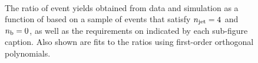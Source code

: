 \begin{figure}[h!]
\begin{center}
    \\
    \caption{The ratio of event yields obtained from data and simulation as a function of \mht [GeV] based on a sample of \mmj events that satisfy $n_{\text{jet}} = 4$ and $n_{\text{b}} = 0$, as well as the requirements on \scalht indicated by each sub-figure caption. Also shown are fits to the ratios using first-order orthogonal polynomials.}
    \label{fig:mhtval_MuMu_eq4j_eq0b}
  \end{center}
\end{figure}


